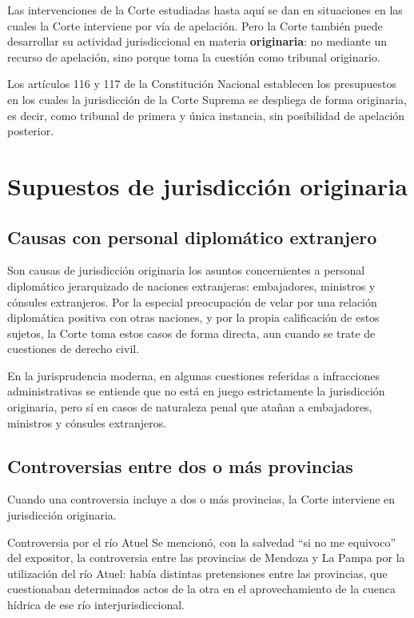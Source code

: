 \documentclass[12pt,oneside]{book}
\begin{document}
Las intervenciones de la Corte estudiadas hasta aquí se dan en situaciones en las cuales la Corte interviene por vía de apelación. Pero la Corte también puede desarrollar su actividad jurisdiccional en materia \textbf{originaria}: no mediante un recurso de apelación, sino porque toma la cuestión como tribunal originario.

\begin{important}
Los artículos 116 y 117 de la Constitución Nacional establecen los presupuestos en los cuales la jurisdicción de la Corte Suprema se despliega de forma originaria, es decir, como tribunal de primera y única instancia, sin posibilidad de apelación posterior.
\end{important}

\section{Supuestos de jurisdicción originaria}

\subsection{Causas con personal diplomático extranjero}

Son causas de jurisdicción originaria los asuntos concernientes a personal diplomático jerarquizado de naciones extranjeras: embajadores, ministros y cónsules extranjeros. Por la especial preocupación de velar por una relación diplomática positiva con otras naciones, y por la propia calificación de estos sujetos, la Corte toma estos casos de forma directa, aun cuando se trate de cuestiones de derecho civil.

En la jurisprudencia moderna, en algunas cuestiones referidas a infracciones administrativas se entiende que no está en juego estrictamente la jurisdicción originaria, pero sí en casos de naturaleza penal que atañan a embajadores, ministros y cónsules extranjeros.

\subsection{Controversias entre dos o más provincias}

Cuando una controversia incluye a dos o más provincias, la Corte interviene en jurisdicción originaria.

\begin{example}{Controversia por el río Atuel}
Se mencionó, con la salvedad ``si no me equivoco'' del expositor, la controversia entre las provincias de Mendoza y La Pampa por la utilización del río Atuel: había distintas pretensiones entre las provincias, que cuestionaban determinados actos de la otra en el aprovechamiento de la cuenca hídrica de ese río interjurisdiccional.
\end{example}
\end{document}
